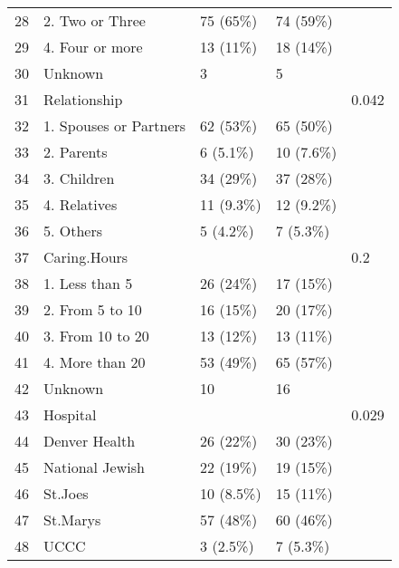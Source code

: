 \begin{table}[ht]
\begin{tabular}{rllll}
  28 & 2. Two or Three & 75 (65\%) & 74 (59\%) &  \\ 
  29 & 4. Four or more & 13 (11\%) & 18 (14\%) &  \\ 
  30 & Unknown & 3 & 5 &  \\ 
  31 & Relationship &  &  & 0.042 \\ 
  32 & 1. Spouses or Partners & 62 (53\%) & 65 (50\%) &  \\ 
  33 & 2. Parents & 6 (5.1\%) & 10 (7.6\%) &  \\ 
  34 & 3. Children & 34 (29\%) & 37 (28\%) &  \\ 
  35 & 4. Relatives & 11 (9.3\%) & 12 (9.2\%) &  \\ 
  36 & 5. Others & 5 (4.2\%) & 7 (5.3\%) &  \\ 
  37 & Caring.Hours &  &  & 0.2 \\ 
  38 & 1. Less than 5 & 26 (24\%) & 17 (15\%) &  \\ 
  39 & 2. From 5 to 10 & 16 (15\%) & 20 (17\%) &  \\ 
  40 & 3. From 10 to 20 & 13 (12\%) & 13 (11\%) &  \\ 
  41 & 4. More than 20 & 53 (49\%) & 65 (57\%) &  \\ 
  42 & Unknown & 10 & 16 &  \\ 
  43 & Hospital &  &  & 0.029 \\ 
  44 & Denver Health & 26 (22\%) & 30 (23\%) &  \\ 
  45 & National Jewish & 22 (19\%) & 19 (15\%) &  \\ 
  46 & St.Joes & 10 (8.5\%) & 15 (11\%) &  \\ 
  47 & St.Marys & 57 (48\%) & 60 (46\%) &  \\ 
  48 & UCCC & 3 (2.5\%) & 7 (5.3\%) &  \\ 
   \hline
\end{tabular}
\end{table}
